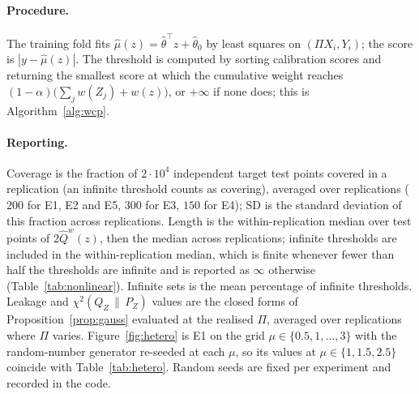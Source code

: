 \documentclass[11pt,a4paper]{article}
\newcommand{\chisqZ}{\chi^2(Q_Z\,\|\,P_Z)}
\theoremstyle{plain}
\theoremstyle{definition}
\theoremstyle{remark}
\begin{document}
\paragraph{Procedure.} The training fold fits $\hat\mu(z)=\hat\theta^{\!\top}z+\hat\theta_0$ by least squares on $(\Pi X_i,Y_i)$; the score is $|y-\hat\mu(z)|$. The threshold is computed by sorting calibration scores and returning the smallest score at which the cumulative weight reaches $(1-\alpha)\bigl(\sum_jw(Z_j)+w(z)\bigr)$, or $+\infty$ if none does; this is Algorithm~\ref{alg:wcp}.

\paragraph{Reporting.} Coverage is the fraction of $2\cdot10^4$ independent target test points covered in a replication (an infinite threshold counts as covering), averaged over replications ($200$ for E1, E2 and E5, $300$ for E3, $150$ for E4); SD is the standard deviation of this fraction across replications. Length is the within-replication median over test points of $2\widehat Q^w(z)$, then the median across replications; infinite thresholds are included in the within-replication median, which is finite whenever fewer than half the thresholds are infinite and is reported as $\infty$ otherwise (Table~\ref{tab:nonlinear}). Infinite sets is the mean percentage of infinite thresholds. Leakage and $\chisqZ$ values are the closed forms of Proposition~\ref{prop:gauss} evaluated at the realised $\Pi$, averaged over replications where $\Pi$ varies. Figure~\ref{fig:hetero} is E1 on the grid $\mu\in\{0.5,1,\dots,3\}$ with the random-number generator re-seeded at each $\mu$, so its values at $\mu\in\{1,1.5,2.5\}$ coincide with Table~\ref{tab:hetero}. Random seeds are fixed per experiment and recorded in the code.
\end{document}
